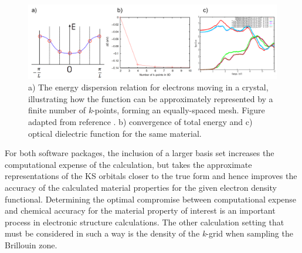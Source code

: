 \documentclass[11pt, twoside]{report}
\begin{document}
\begin{figure}[h!]
  \centering
    \includegraphics[width=1.0\textwidth]{figures/k_sampling_full.png}
    \caption[a) The energy dispersion relation for electrons moving in a crystal, illustrating how the function can be approximately represented by a finite number of \textit{k}-points, forming an equally-spaced mesh. b) convergence of total energy and c) optical dielectric function for the same material.]{a) The energy dispersion relation for electrons moving in a crystal, illustrating how the function can be approximately represented by a finite number of \textit{k}-points, forming an equally-spaced mesh. Figure adapted from reference . b) convergence of total energy and c) optical dielectric function for the same material.}
  \label{k_sampling}
\end{figure}

For both software packages, the inclusion of a larger basis set increases the computational expense of the calculation, but takes the approximate representations of the KS orbitals closer to the true form and hence improves the accuracy of the calculated material properties for the given electron density functional. Determining the optimal compromise between computational expense and chemical accuracy for the material property of interest is an important process in electronic structure calculations. The other calculation setting that must be considered in such a way is the density of the \textit{k}-grid when sampling the Brillouin zone.
\end{document}
